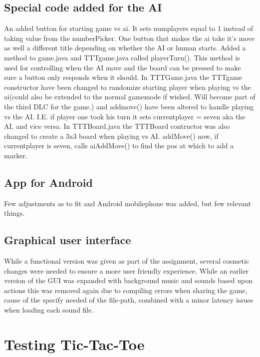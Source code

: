 \documentclass[a4paper,10pt]{article}
\begin{document}
	
	\subsection{Special code added for the AI}
	An added button for starting game vs ai. It sets numplayers equal to 1 instead of taking value from the numberPicker.
	One button that makes the ai take it's move as well a different title depending on whether the AI or human starts.
	Added a method to game.java and TTTgame.java called playerTurn(). This method is used for controlling when the AI move and the board can be pressed to make sure a button only responds when it should.
	In TTTGame.java the TTTgame constructor have been changed to randomize starting player when playing vs the ai(could also be extended to the normal gamemode if wished. Will become part of the third DLC for the game.) and addmove() have been altered to handle playing vs the AI. I.E. if player one took his turn it sets currentplayer = seven aka the AI, and vice versa.
	In TTTBoard.java the TTTBoard contructor was also changed to create a 3x3 board when playing vs AI. addMove() now, if currentplayer is seven, calls aiAddMove() to find the pos at which to add a marker.
	
	
	\subsection{App for Android}
	Few adjustments as to fit and Android mobilephone was added, but few relevant things.
	\subsection{Graphical user interface}
	While a functional version was given as part of the assignment, several cosmetic changes were needed to ensure a more user friendly experience. While an earlier version of the GUI was expanded with background music and sounds based upon actions this was removed again due to compiling errors when sharing the game, cause of the specify needed of the file-path, combined with a minor latency issues when loading each sound file.
	
	\section{Testing Tic-Tac-Toe}
	
\end{document}

